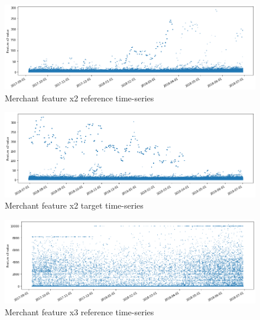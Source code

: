 \begin{figure}[!htb]
    \begin{center}
      \includegraphics[scale=0.5]{figures/merchant-x2-reference.png}
      \caption{Merchant feature x2 reference time-series}
      \label{fig:merchant-x2-reference}
    \end{center}
\end{figure}

\begin{figure}[!htb]
    \begin{center}
      \includegraphics[scale=0.5]{figures/merchant-x2-target.png}
      \caption{Merchant feature x2 target time-series}
      \label{fig:merchant-x2-target}
    \end{center}
\end{figure}


\begin{figure}[!htb]
    \begin{center}
      \includegraphics[scale=0.5]{figures/merchant-x3-reference.png}
      \caption{Merchant feature x3 reference time-series}
      \label{fig:merchant-x3-reference}
    \end{center}
\end{figure}

